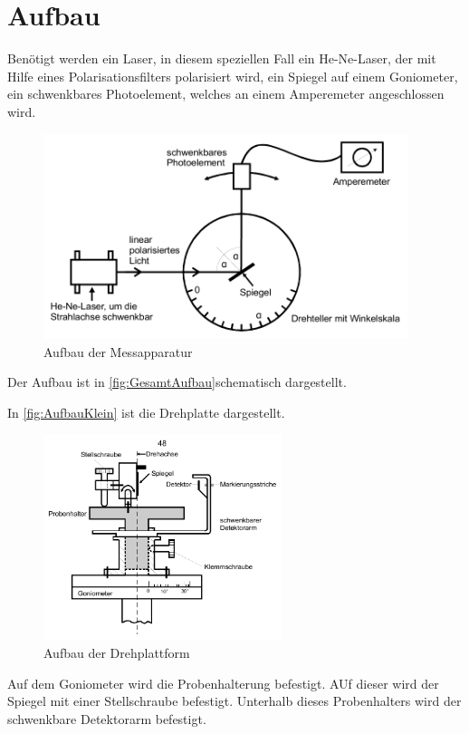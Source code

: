 \section{Aufbau}

\label{sec:Aufbau}
Benötigt werden ein Laser, in diesem speziellen Fall ein He-Ne-Laser, der mit Hilfe eines Polarisationsfilters polarisiert wird, ein Spiegel auf einem Goniometer, ein schwenkbares Photoelement, welches an einem Amperemeter angeschlossen wird. 
\begin{figure}
    \centering
    \includegraphics[height = 6cm]{GesamtAufbau.pdf}
    \caption{Aufbau der Messapparatur}
    \label{fig:GesamtAufbau}
\end{figure}
Der Aufbau ist in \autoref{fig:GesamtAufbau}schematisch dargestellt.

In \autoref{fig:AufbauKlein} ist die Drehplatte dargestellt.
\begin{figure}
    \centering
    \includegraphics[height = 6cm]{AufbauKlein.pdf}
    \caption{Aufbau der Drehplattform}
    \label{fig:AufbauKlein}
\end{figure}
Auf dem Goniometer wird die Probenhalterung befestigt. AUf dieser wird der Spiegel mit einer Stellschraube befestigt. Unterhalb dieses Probenhalters wird der schwenkbare Detektorarm befestigt.
